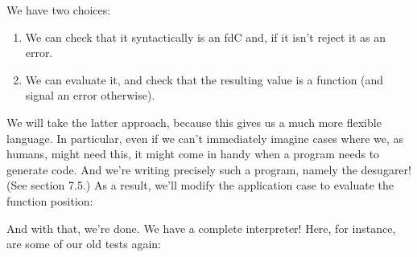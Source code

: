 
We have two choices:
\begin{enumerate}[nosep]
  \item 
We can check that it syntactically is an fdC and, if it isn’t reject it as an
error.
  \item 
We can evaluate it, and check that the resulting value is a function (and signal
an error otherwise).
\end{enumerate}
We will take the latter approach, because this gives us a much more flexible
language. In particular, even if we can’t immediately imagine cases where we, as
humans, might need this, it might come in handy when a program needs to generate
code. And we’re writing precisely such a program, namely the desugarer! (See
section 7.5.) As a result, we’ll modify the application case to evaluate the
function position:


And with that, we’re done. We have a complete interpreter! Here, for instance,
are some of our old tests again:
